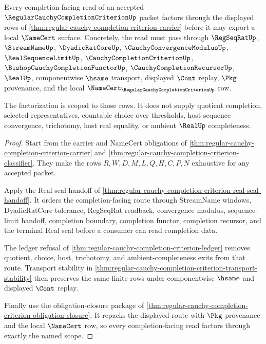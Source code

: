 \begin{theorem}
\label{thm:regular-cauchy-completion-criterion-scope-factorization}
Every completion-facing read of an accepted $\RegularCauchyCompletionCriterionUp$ packet factors through the displayed rows of \autoref{thm:regular-cauchy-completion-criterion-carrier} before it may export a local $\NameCert$ surface. Concretely, the read must pass through $\RegSeqRatUp$, $\StreamNameUp$, $\DyadicRatCoreUp$, $\CauchyConvergenceModulusUp$, $\RealSequenceLimitUp$, $\CauchyCompletionCriterionUp$, $\BishopCauchyCompletionFunctorUp$, $\CauchyCompletionRecursorUp$, $\RealUp$, componentwise $\hsame$ transport, displayed $\Cont$ replay, $\Pkg$ provenance, and the local $\NameCert_{\RegularCauchyCompletionCriterionUp}$ row.

The factorization is scoped to those rows. It does not supply quotient completion, selected representatives, countable choice over thresholds, host sequence convergence, trichotomy, host real equality, or ambient $\RealUp$ completeness.
\end{theorem}
\begin{proof}
Start from the carrier and NameCert obligations of \autoref{thm:regular-cauchy-completion-criterion-carrier} and \autoref{thm:regular-cauchy-completion-criterion-classifier}. They make the rows $R,W,D,M,L,Q,H,C,P,N$ exhaustive for any accepted packet.

Apply the Real-seal handoff of \autoref{thm:regular-cauchy-completion-criterion-real-seal-handoff}. It orders the completion-facing route through StreamName windows, DyadicRatCore tolerance, RegSeqRat readback, convergence modulus, sequence-limit handoff, completion boundary, completion functor, completion recursor, and the terminal Real seal before a consumer can read completion data.

The ledger refusal of \autoref{thm:regular-cauchy-completion-criterion-ledger} removes quotient, choice, host, trichotomy, and ambient-completeness exits from that route. Transport stability in \autoref{thm:regular-cauchy-completion-criterion-transport-stability} then preserves the same finite rows under componentwise $\hsame$ and displayed $\Cont$ replay.

Finally use the obligation-closure package of \autoref{thm:regular-cauchy-completion-criterion-obligation-closure}. It repacks the displayed route with $\Pkg$ provenance and the local $\NameCert$ row, so every completion-facing read factors through exactly the named scope.
\end{proof}

